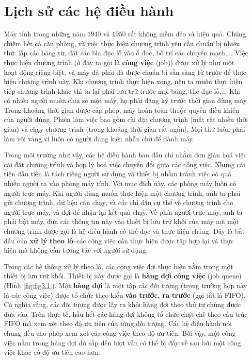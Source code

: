 
\section{Lịch sử  các hệ điều hành}
\label{sec:31}

Máy tính trong những năm $1940$ và $1950$ rất không mềm dẻo và hiệu quả. Chúng chiếm hết
cả căn phòng, và việc thực hiện chương trình yêu cầu chuẩn bị nhiều thứ: lắp các băng từ,
đặt các bìa đục lỗ vào ổ đọc, bố trí các chuyển mạch,... Việc thực hiện chương trình (ở
đây ta gọi là \textbf{công việc} (job)) được xử lý như một hoạt động riêng biệt, và máy đã
phải đã được chuẩn bị sẵn sàng từ trước để thực hiện chương trình này.  Khi chương trình
thực hiện xong, nếu ta muốn thực hiện tiếp chương trình khác thì ta lại phải lưu trữ trước
mọi băng, thẻ đục lỗ,... Khi có nhiều người muốn chia sẻ một máy, họ phải đăng ký trước
thời gian dùng máy. Trong khoảng thời gian được cấp phép, máy hoàn toàn thuộc quyền điều
khiển của người dùng. Phiên làm việc bao gồm cài đặt chương trình (mất rất nhiều thời
gian) và chạy chương trình (trong khoảng thời gian rất ngắn). Mọi thứ luôn phải làm vội
vàng vì luôn có người đang kiên nhẫn chờ để dành máy.

Trong môi trường như vậy, các hệ điều hành ban đầu chỉ nhằm đơn giản hoá việc cài đặt
chương trình và hợp lý hoá việc chuyển đổi giữa các công việc. Những cải tiến đầu tiên là
tách riêng người sử dụng và thiết bị nhằm tránh việc có quá nhiều người ra vào phòng máy
tính. Với mục đích này, các phòng máy luôn có người trực máy. Khi người dùng muốn thực
hiện một chương trình, anh ta phải gửi chương trình, dữ liệu cần chạy, và các chỉ dẫn cụ
thể về chương trình cho người trực máy, và đợi để nhận lại kết quả chạy. Về phía người
trực máy, anh ta phải bật máy, đưa các thông tin này vào thiết bị lưu trữ khối của máy nơi
một chương trình được gọi là hệ điều hành có thể đọc và thực hiện chúng. Đây là bắt đầu
của \textbf{xử lý theo lô}--các công việc cần thực hiện được tập hợp lại và thực hiện mà
không cần tương tác với người sử dụng.


Trong các hệ thống xử lý theo lô, các công việc đợi thực hiện nằm trong một thiết bị lưu
trữ khối. Thiết bị này được gọi là \textbf{hàng đợi công việc} (job queue) (Hình
\ref{fig:fig3.1}). Một \textbf{hàng đợi} là một tập các đối tượng (trong trường hợp này là
các công việc) được tổ chức theo kiểu \textbf{vào trước, ra trước} (gọi tắt là FIFO). Có
nghĩa rằng, các đối tượng được lấy ra khỏi hàng đợi theo thứ tự chúng được đưa vào. Trên
thực tế, hầu hết các hàng đợi không tổ chức chặt chẽ theo cấu trúc FIFO mà xem xét theo độ
ưu tiên của từng đối tượng. Các hệ điều hành nói chung đều cho phép xem xét các công việc
theo độ ưu tiên. Bởi vậy, một công việc nằm trong hàng đợi dù sắp đến lượt vẫn có thể bị
đẩy về sau bởi một công việc khác có độ ưu tiên cao hơn.


